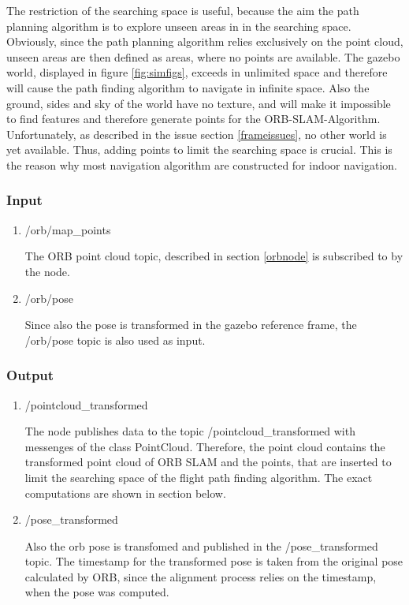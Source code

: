 	The restriction of the searching space is useful, because the aim the path planning algorithm is to explore unseen areas in in the searching space. Obviously, 
	since the path planning algorithm relies exclusively on the point cloud, unseen areas are then defined as areas, where no points are available. The gazebo world, 
	displayed in figure \ref{fig:simfigs}, exceeds in unlimited space and therefore will cause the path finding algorithm to navigate in infinite space. Also the ground, sides and 
	sky of the world have no texture, and will make it impossible to find features and therefore generate points for the ORB-SLAM-Algorithm. Unfortunately, 
	as described in the issue section \ref{frameissues}, no other world is yet available. Thus, adding points to 
	limit the searching space is crucial. This is the reason why most navigation algorithm are constructed for indoor navigation.
	
	\subsubsection{Input}
	
	\begin{enumerate}
	\item{/orb/map\_points}
	
	The ORB point cloud topic, described in section \ref{orbnode} is subscribed to by the node. 
	
	\item{/orb/pose}
	
	Since also the pose is transformed in the gazebo reference frame, the /orb/pose topic is also used as input. 
	
	\end{enumerate}
	
	\subsubsection{Output}
	
	\begin{enumerate}
	\item{/pointcloud\_transformed}
	
	The node publishes data to the topic /pointcloud\_transformed with messenges of the class PointCloud. Therefore, the point cloud contains the transformed 
	point cloud of ORB SLAM and the points, that are inserted to limit the searching space of the flight path finding algorithm. 
	The exact computations are shown 
	in section below. 
	
	\item{/pose\_transformed}
	
	Also the orb pose is transfomed and published in the /pose\_transformed topic. The timestamp for the transformed pose is taken from the original pose 
	calculated by ORB, since the alignment process relies on the timestamp, when the pose was computed. 
	
	\end{enumerate}
	
